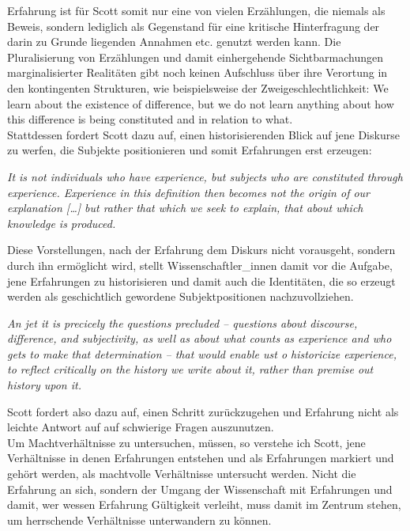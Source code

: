 \noindent Erfahrung ist für Scott somit nur eine von vielen
Erzählungen, die niemals als Beweis, sondern lediglich als Gegenstand für eine
kritische Hinterfragung der darin zu Grunde liegenden Annahmen etc. genutzt
werden kann. Die Pluralisierung von Erzählungen und damit einhergehende
Sichtbarmachungen marginalisierter Realitäten gibt noch keinen Aufschluss über
ihre Verortung in den kontingenten Strukturen, wie beispielsweise der
Zweigeschlechtlichkeit: \glqq We learn about the existence of difference, but we do
not learn anything about how this difference is being constituted and in
relation to what.\grqq \footnotemark {}\\  
Stattdessen fordert Scott dazu auf, einen historisierenden Blick auf jene Diskurse zu werfen, die Subjekte positionieren und somit Erfahrungen erst erzeugen:
\begin{myenv}
 \textit{\glqq 
It is not individuals who have experience, but subjects who are constituted through experience. Experience in this definition then becomes not the origin of our explanation […] but rather that which we seek to explain, that about which knowledge is produced.\grqq}
\footnotemark {}
\end{myenv}
Diese Vorstellungen, nach der Erfahrung dem Diskurs nicht vorausgeht, sondern
durch ihn ermöglicht wird, stellt Wissenschaftler\_innen damit vor die Aufgabe,
jene Erfahrungen zu historisieren und damit auch die Identitäten, die so
erzeugt werden als geschichtlich gewordene Subjektpositionen nachzuvollziehen.
\begin{myenv}
 \textit{\glqq 
 An jet it is precicely the questions precluded – questions about discourse, difference, and subjectivity, as well as about what counts as experience and who gets to make that determination – that would enable ust o historicize experience, to reflect critically on the history we write about it, rather than premise out history upon it.\grqq}
\footnotemark {}
\end{myenv}
Scott fordert also dazu auf, einen Schritt zurückzugehen und Erfahrung nicht
als leichte Antwort auf auf schwierige Fragen auszunutzen.\\

\noindent Um Machtverhältnisse
zu untersuchen, müssen, so verstehe ich Scott, jene Verhältnisse in denen
Erfahrungen entstehen und als Erfahrungen markiert und gehört werden, als
machtvolle Verhältnisse untersucht werden. Nicht die Erfahrung an sich, sondern
der Umgang der Wissenschaft mit Erfahrungen und damit, wer wessen Erfahrung
Gültigkeit verleiht, muss damit im Zentrum stehen, um herrschende Verhältnisse
unterwandern zu können.\\


